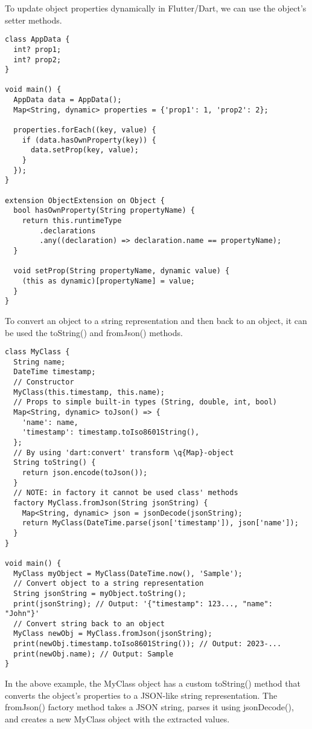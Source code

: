 To update object properties dynamically in Flutter/Dart, we can use the object's setter methods.

\begin{lstlisting}
class AppData {
  int? prop1;
  int? prop2;
}

void main() {
  AppData data = AppData();
  Map<String, dynamic> properties = {'prop1': 1, 'prop2': 2};

  properties.forEach((key, value) {
    if (data.hasOwnProperty(key)) {
      data.setProp(key, value);
    }
  });
}

extension ObjectExtension on Object {
  bool hasOwnProperty(String propertyName) {
    return this.runtimeType
        .declarations
        .any((declaration) => declaration.name == propertyName);
  }

  void setProp(String propertyName, dynamic value) {
    (this as dynamic)[propertyName] = value;
  }
}
\end{lstlisting}

To convert an object to a string representation and then back to an object, it can be used the toString() 
and fromJson() methods. 

\begin{lstlisting}
class MyClass {
  String name;
  DateTime timestamp;
  // Constructor
  MyClass(this.timestamp, this.name);
  // Props to simple built-in types (String, double, int, bool)
  Map<String, dynamic> toJson() => {
    'name': name,
    'timestamp': timestamp.toIso8601String(),
  };
  // By using 'dart:convert' transform \q{Map}-object
  String toString() {
    return json.encode(toJson());
  }
  // NOTE: in factory it cannot be used class' methods
  factory MyClass.fromJson(String jsonString) {
    Map<String, dynamic> json = jsonDecode(jsonString);
    return MyClass(DateTime.parse(json['timestamp']), json['name']);
  }
}

void main() {
  MyClass myObject = MyClass(DateTime.now(), 'Sample');
  // Convert object to a string representation
  String jsonString = myObject.toString();
  print(jsonString); // Output: '{"timestamp": 123..., "name": "John"}'
  // Convert string back to an object
  MyClass newObj = MyClass.fromJson(jsonString);
  print(newObj.timestamp.toIso8601String()); // Output: 2023-...
  print(newObj.name); // Output: Sample
}
\end{lstlisting}

In the above example, the MyClass object has a custom toString() method that converts the object's properties to a 
JSON-like string representation. The fromJson() factory method takes a JSON string, parses it using jsonDecode(), 
and creates a new MyClass object with the extracted values.


